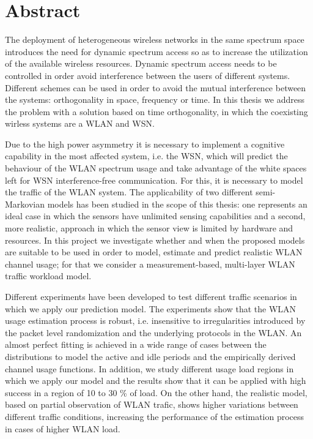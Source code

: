 \chapter*{Abstract}
\thispagestyle{begin}



The deployment of heterogeneous wireless networks in the same spectrum space introduces the need for dynamic spectrum access so as to increase the utilization of the available wireless resources. Dynamic spectrum access needs to be controlled in order avoid interference between the users of different systems. Different schemes can be used in order to avoid the mutual interference between the systems: orthogonality in space, frequency or time. In this thesis we address the problem with a solution based on time orthogonality, in which the coexisting wirless systems are a \acs{WLAN} and \acs{WSN}.

Due to the high power asymmetry it is necessary to implement a cognitive capability in the most affected system, i.e. the WSN, which will predict the behaviour of the WLAN spectrum usage and take advantage of the white spaces left for WSN interference-free communication. For this, it is necessary to model the traffic of the WLAN system. The applicability of two different semi-Markovian models has been studied in the scope of this thesis: one represents an ideal case in which the sensors have unlimited sensing capabilities and a second, more realistic, approach in which the sensor view is limited by hardware and resources. In this project we investigate whether and when the proposed models are suitable to be used in order to model, estimate and predict realistic \acs{WLAN} channel usage; for that we consider a measurement-based, multi-layer WLAN traffic workload model.

Different experiments have been developed to test different traffic scenarios in which we apply our prediction model. The experiments show that the WLAN usage estimation process is robust, i.e. insensitive to irregularities introduced by the packet level randomization and the underlying protocols in the WLAN. An almost perfect fitting is achieved in a wide range of cases between the distributions to model the active and idle periods and the empirically derived channel usage functions. In addition, we study different usage load regions in which we apply our model and the results show that it can be applied with high success in a region of 10 to 30 \% of load. On the other hand, the realistic model, based on partial observation of WLAN trafic, shows higher variations between different traffic conditions, increasing the performance of the estimation process in cases of higher WLAN load.


\acresetall %
